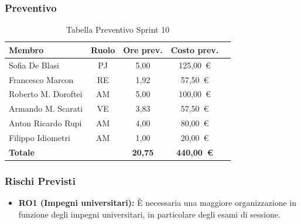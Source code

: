 \subsubsection{Preventivo}
\begin{table}[H]
    \centering
    \renewcommand{\arraystretch}{1.3}
    \begin{tabularx}{\textwidth}{|X|c|c|c|r|}
        \hline
        \textbf{Membro} & \textbf{Ruolo} & \textbf{Ore prev.} & \textbf{Costo prev.} \\
        \hline
        Sofia De Blasi       & PJ & 5,00 & 125{,}00~\euro \\
        Francesco Marcon     & RE & 1,92 & 57{,}50~\euro \\
        Roberto M. Doroftei  & AM & 5,00 & 100{,}00~\euro \\
        Armando M. Scarati   & VE & 3,83 & 57{,}50~\euro \\
        Anton Ricardo Rupi   & AM & 4,00 & 80{,}00~\euro \\
        Filippo Idiometri    & AM & 1,00 & 20{,}00~\euro \\
        \hline
        \textbf{Totale}      &    & \textbf{20,75} & \textbf{440{,}00~\euro} \\
        \hline
    \end{tabularx}
    \caption{Tabella Preventivo Sprint 10} 
\end{table}

\subsubsection{Rischi Previsti}
\begin{itemize}
    \item \textbf{RO1 (Impegni universitari):} È necessaria una maggiore organizzazione in funzione degli impegni universitari, in particolare degli esami di sessione.
\end{itemize}

